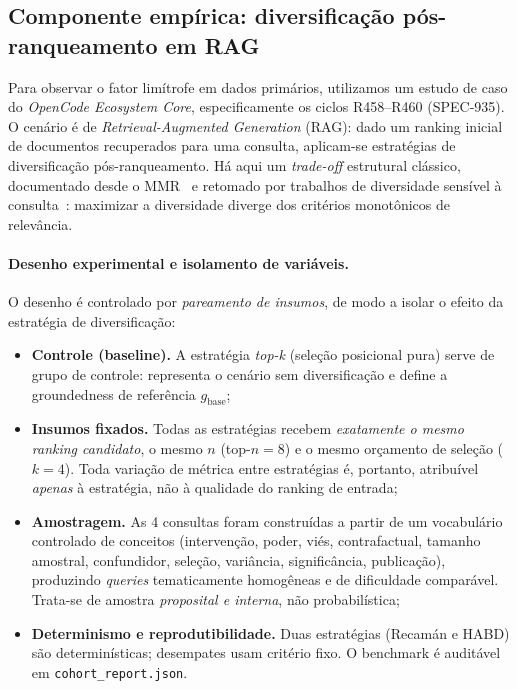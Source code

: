 \subsection{Componente empírica: diversificação pós-ranqueamento em RAG}

Para observar o fator limítrofe em dados primários, utilizamos um estudo de caso
do \emph{OpenCode Ecosystem Core}, especificamente os ciclos R458--R460 (SPEC-935).
O cenário é de \emph{Retrieval-Augmented Generation} (RAG): dado um ranking
inicial de documentos recuperados para uma consulta, aplicam-se estratégias de
diversificação pós-ranqueamento. Há aqui um \emph{trade-off} estrutural clássico,
documentado desde o MMR~\parencite{CarbonellGoldstein1998MMR} e retomado por
trabalhos de diversidade sensível à consulta~\parencite{Khan2026DFRAG,
RezaeiDieng2025VendiRAG}: maximizar a diversidade diverge dos critérios
monotônicos de relevância.

\paragraph{Desenho experimental e isolamento de variáveis.}
O desenho é controlado por \emph{pareamento de insumos}, de modo a isolar o
efeito da estratégia de diversificação:
\begin{itemize}
  \item \textbf{Controle (baseline).} A estratégia \emph{top-k} (seleção posicional
        pura) serve de grupo de controle: representa o {cenário} sem diversificação
        e define a groundedness de referência $g_{\mathrm{base}}$;
  \item \textbf{Insumos fixados.} Todas as estratégias recebem \emph{exatamente o
        mesmo ranking candidato}, o mesmo $n$ (top-$n{=}8$) e o mesmo orçamento
        de seleção ($k{=}4$). Toda variação de métrica entre estratégias é,
        portanto, atribuível \emph{apenas} à estratégia, não à qualidade do
        ranking de entrada;
  \item \textbf{Amostragem.} As 4 consultas foram construídas a partir de um
        vocabulário controlado de conceitos (intervenção, poder, viés,
        contrafactual, tamanho amostral, confundidor, seleção, variância,
        significância, publicação), produzindo \emph{queries} tematicamente
        homogêneas e de dificuldade comparável. Trata-se de amostra
        \emph{proposital e interna}, não probabilística;
  \item \textbf{Determinismo e reprodutibilidade.} Duas estratégias (Recamán e
        HABD) são determinísticas; desempates usam critério fixo. O benchmark é
        auditável em \texttt{cohort\_report.json}.
\end{itemize}

